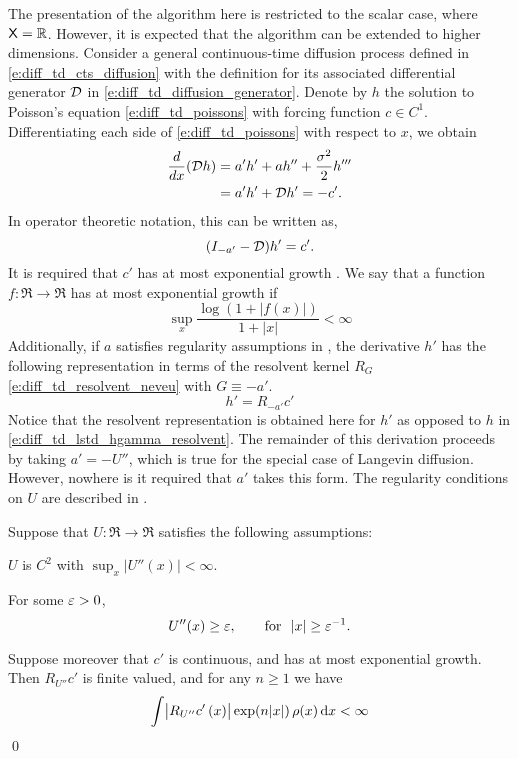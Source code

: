The presentation of the algorithm here is restricted to the scalar case, where ${\sf X} = \mathbb{R}$. However, it is expected that the algorithm can be extended to higher dimensions. 
Consider a general continuous-time diffusion process defined in \eqref{e:diff_td_cts_diffusion} with the definition for its associated differential generator ${\cal D}$ in \eqref{e:diff_td_diffusion_generator}. Denote by $h$ the solution to Poisson's equation \eqref{e:diff_td_poissons} with forcing function $c \in C^1$.  Differentiating each side of \eqref{e:diff_td_poissons} with respect to $x$, we obtain
\begin{equation}
\begin{aligned}
\frac{d}{dx} ({\cal D} h) & = a'h' + ah'' + \frac{\sigma^2}{2} h''' \\
&  = 	a'h' + {\cal D} h'  = -c'.
\end{aligned}
\end{equation}
In operator theoretic notation, this can be written as,
\begin{equation}
(I_{-a'} - {\cal D})h' = c'.
\end{equation}
It is required that $c'$ has at most exponential growth \cite{devkonmey17b}. We say that a function $f\colon\Re\to\Re$ has at most exponential growth if
\begin{equation}
\sup_x  \frac{ \log(1+|f(x)|)}{1+|x|}  <\infty
\end{equation}
Additionally, if $a$ satisfies regularity assumptions in , the derivative $h'$ has the following representation in terms of the resolvent kernel $R_G$ \eqref{e:diff_td_resolvent_neveu} with $G \equiv -a'$. 
\begin{equation}
h' = R_{-a'} c'
\label{e:diff_td_gradTD_h'_resolvent}
\end{equation}
Notice that the resolvent representation is obtained here for $h'$ as opposed to $h$ in \eqref{e:diff_td_lstd_hgamma_resolvent}. The remainder of this derivation proceeds by taking $a' = -U''$, which is true for the special case of Langevin diffusion. However, nowhere is it required that $a'$ takes this form. The regularity conditions on $U$ are described in .
\begin{proposition}
	\label{prop:regularity_U}
	Suppose that $U\colon\Re\to\Re$ satisfies the following assumptions:
	\begin{romannum}
		\item $U$ is $C^2$ with $\sup_x |U''(x)| <\infty$.
		\item  For some $\varepsilon>0$,
		\begin{equation}
		U''(x) \ge \varepsilon,\qquad \text{for} \ \ |x|\ge \varepsilon^{-1}.
		\end{equation}
	\end{romannum}
	Suppose moreover that $c'$ is continuous, and has at most exponential growth.
	Then $ R_{U''} c'$ is finite valued, and for any $n\ge 1$ we have
	\begin{equation}
	\int   \bigl|  R_{U''} c'\, (x) \bigr|\exp(n |x|)  \, \rho(x) \,\textmd{d} x  <\infty
	\end{equation}
	\qed
\end{proposition}

